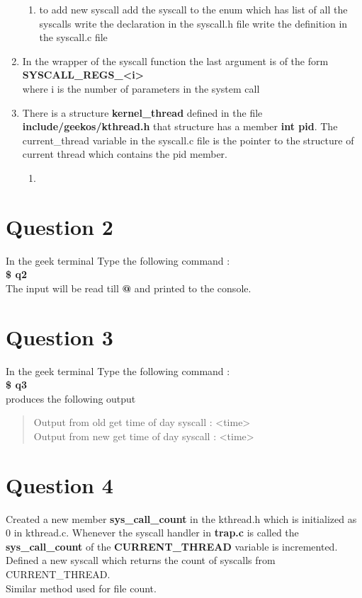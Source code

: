 \documentclass[11pt]{article}
\begin{document}
\begin{enumerate}
\begin{enumerate}
\item to add new syscall 
      add the syscall to the enum which has list of all the syscalls
      write the declaration in the syscall.h file
      write the definition in the syscall.c file
\end{enumerate}
\item In the wrapper of the syscall function the last argument is of the form \\
\textbf{SYSCALL\_{}REGS_<i>}   \\
     where i is the number of parameters in the system call
\item There is a structure \textbf{kernel\_{}thread} defined in the file \textbf{include/geekos/kthread.h}
     that structure has a member \textbf{int pid}. The current\_{}thread variable in the syscall.c
     file is the pointer to the structure of current thread which contains the pid member.
\begin{enumerate}
\item 
\end{enumerate}
\end{enumerate}
\section{Question 2}
\label{sec-2}

  In the geek terminal Type the following command : \\
  \textbf{\$ q2} \\
  The input will be read till \textbf{@} and printed to the console.
    
\section{Question 3}
\label{sec-3}

  In the geek terminal Type the following command : \\
  \textbf{\$ q3}\\
  produces the following output
\begin{quote}
Output from old get time of day syscall : <time> \\
Output from new get time of day syscall : <time>
\end{quote}
\section{Question 4}
\label{sec-4}

  Created a new member \textbf{sys\_{}call\_{}count} in the kthread.h
  which is initialized as 0 in kthread.c. Whenever the syscall handler
  in \textbf{trap.c} is called the \textbf{sys\_{}call\_{}count} of the \textbf{CURRENT\_{}THREAD}
  variable is incremented. Defined a new syscall which returns the count
  of syscalls from CURRENT\_{}THREAD.\\
  Similar method used for file count.
\end{document}
